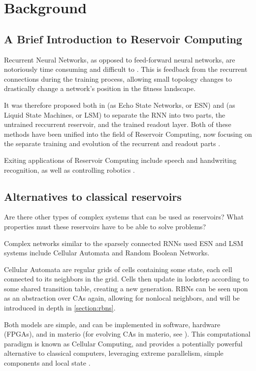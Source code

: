 \chapter{Background}

\section{A Brief Introduction to Reservoir Computing}

Recurrent Neural Networks, as opposed to feed-forward neural networks,
are notoriously time consuming and difficult to .
This is  feedback from the recurrent connections during the training process,
allowing small topology changes to drastically change a network's position in the fitness landscape.

It was therefore proposed both in \cite{jaeger2002adaptive} (as Echo State Networks, or ESN)
and \cite{natschlager2002liquid} (as Liquid State Machines, or LSM) to separate the RNN into two parts,
the untrained reccurrent reservoir, and the trained readout layer.
Both of these methods have been unified into the field of Reservoir Computing,
now focusing on the separate training and evolution of the recurrent and readout parts \cite{lukovsevivcius2012reservoir}.

Exiting applications of Reservoir Computing include speech and handwriting recognition,
as well as controlling robotics \cite{lukovsevivcius2012reservoir}.

\section{Alternatives to classical reservoirs}

Are there other types of complex systems that can be used as reservoirs?
What properties must these reservoirs have to be able to solve problems?

Complex networks similar to the sparsely connected RNNs used  ESN and LSM systems include Cellular Automata and Random Boolean Networks.

Cellular Automata are regular grids of cells containing some state,
each cell connected to its neighbors in the grid.
Cells then update in lockstep according to some shared transition table,
creating a new generation.
RBNs can be seen upon as an abstraction over CAs again,
allowing for nonlocal neighbors, and will be introduced in depth in \ref{section:rbns}.

Both models are simple, and can be implemented in software,
hardware (FPGAs), and in materio \cite{miller2002evolution}
(for evolving CAs in materio, see \cite{farstad2015evolving}).
This computational paradigm is known as Cellular Computing,
and provides a potentially powerful alternative to classical computers,
leveraging extreme parallelism, simple components and local state \cite{sipper1999emergence}.

